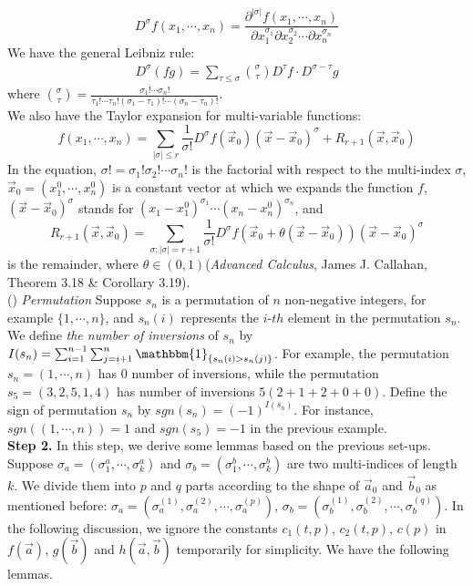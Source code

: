 \documentclass[12pt]{article}
\begin{document}
$$D^{\sigma}f(x_{1},\cdots,x_{n})=\frac{\partial^{|\sigma|}f(x_{1},\cdots,x_{n})}{\partial x_{1}^{\sigma_{1}}\partial x_{2}^{\sigma_{2}}\cdots \partial x_{n}^{\sigma_{n}}}$$ We have the general Leibniz rule:
\begin{align*}
	D^{\sigma}(fg)=\sum_{\tau\leqslant\sigma}\binom{\sigma}{\tau}D^{\tau}f\cdot D^{\sigma-\tau}g
\end{align*}
where $\binom{\sigma}{\tau}=\frac{\sigma_{1}!\cdots\sigma_{n}!}{\tau_{1}!\cdots\tau_{n}!(\sigma_{1}-\tau_{1})!\cdots(\sigma_{n}-\tau_{n})!}$.\\
We also have the Taylor expansion for multi-variable functions:
$$f(x_{1},\cdots,x_{n})=\sum_{|\sigma|\leqslant r}\frac{1}{\sigma!}D^{\sigma}f(\vec{x}_{0})(\vec{x}-\vec{x}_{0})^{\sigma}+R_{r+1}(\vec{x},\vec{x}_{0})$$ 
In the equation, $\sigma!=\sigma_{1}!\sigma_{2}!\cdots\sigma_{n}!$ is the factorial with respect to the multi-index $\sigma$, $\vec{x}_{0}=(x_{1}^{0},\cdots,x_{n}^{0})$ is a constant vector at which we expands the function $f$, $(\vec{x}-\vec{x}_{0})^{\sigma}$ stands for $(x_{1}-x_{1}^{0})^{\sigma_{1}}\cdots(x_{n}-x_{n}^{0})^{\sigma_{n}}$, and $$R_{r+1}(\vec{x},\vec{x}_{0})=\sum_{\sigma:|\sigma|=r+1}\frac{1}{\sigma!}D^{\sigma}f(\vec{x}_{0}+\theta(\vec{x}-\vec{x}_{0}))(\vec{x}-\vec{x}_{0})^{\sigma}$$ is the remainder, where $\theta\in (0,1)$(\emph{Advanced Calculus}, James J. Callahan, Theorem 3.18 \& Corollary 3.19).\\
() \emph{Permutation} Suppose $s_{n}$ is a permutation of $n$ non-negative integers, for example $\{1,\cdots,n\}$, and $s_{n}(i)$ represents the $i$-$th$ element in the permutation $s_{n}$. We define \emph{the number of inversions} of $s_{n}$ by $I(s_{n})=\sum_{i=1}^{n-1}\sum_{j=i+1}^{n}\mathbbm{1}_{\{s_{n}(i)>s_{n}(j)\}}$. For example, the permutation $s_{n}=(1,\cdots,n)$ has $0$ number of inversions, while the permutation $s_{5}=(3,2,5,1,4)$ has number of inversions $5(2+1+2+0+0)$. Define the sign of permutation $s_{n}$ by $sgn(s_{n})=(-1)^{I(s_{n})}$. For instance, $sgn((1,\cdots,n))=1$ and $sgn(s_{5})=-1$ in the previous example.\\
\textbf{Step 2. }In this step, we derive some lemmas based on the previous set-ups. Suppose $\sigma_{a}=(\sigma_{1}^{a},\cdots,\sigma_{k}^{a})$ and $\sigma_{b}=(\sigma_{1}^{b},\cdots,\sigma_{k}^{b})$ are two multi-indices of length $k$. We divide them into $p$ and $q$ parts according to the shape of $\vec{a}_{0}$ and $\vec{b}_{0}$ as mentioned before: $\sigma_{a}=(\sigma^{(1)}_{a},\sigma^{(2)}_{a},\cdots,\sigma^{(p)}_{a})$, $\sigma_{b}=(\sigma^{(1)}_{b},\sigma^{(2)}_{b},\cdots,\sigma^{(q)}_{b})$. In the following discussion, we ignore the constants $c_{1}(t,p)$, $c_{2}(t,p)$, $c(p)$ in $f(\vec{a})$, $g(\vec{b})$ and $h(\vec{a},\vec{b})$ temporarily for simplicity. We have the following lemmas.\\
\end{document}
